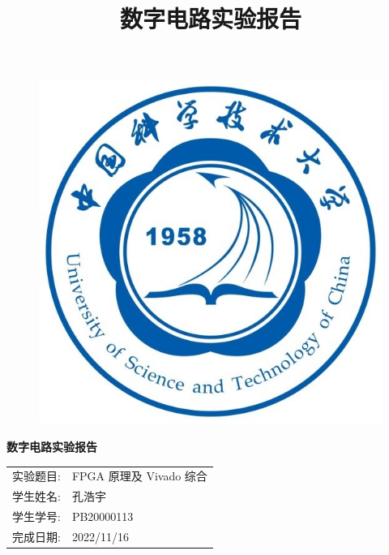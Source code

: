 \documentclass{article}
\title{\heiti 数字电路实验报告 }
\begin{document}
	\vspace*{1cm}
	
	\begin{figure}[h]
		\centering
		\includegraphics[scale=1.0]{xh.jpg}
	\end{figure}

	\vspace*{0.5cm}
	
	\begin{center}
		\Huge{\textbf{数字电路实验报告}}
	\end{center}
	
	\vspace{5cm}
	
	\begin{table}[h]
		\centering
		\begin{Large}
			\begin{tabular}{p{3cm} p{7cm}<{\centering}}
				实验题目: &   FPGA 原理及 Vivado 综合     \\ \cline{2-2}
				学生姓名:      & 孔浩宇   \\ \cline{2-2}
				学生学号: & PB20000113 \\ \cline{2-2}
				完成日期:       & 2022/11/16 \\ \cline{2-2}
			\end{tabular}
		\end{Large}		
	\end{table}
	\newpage
\end{document}
